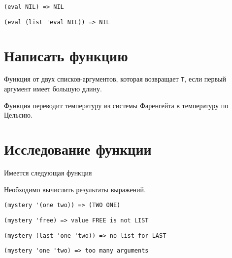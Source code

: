 \problem \hfill
\begin{lstlisting}
(eval NIL) => NIL
\end{lstlisting}


\problem \hfill
\begin{lstlisting}
(eval (list 'eval NIL)) => NIL
\end{lstlisting}



\section{Написать функцию}

\problem Функция от двух списков-аргументов, которая возвращает \verb|T|, если первый аргумент имеет большую длину.



\problem Функция переводит температуру из системы Фаренгейта в температуру по Цельсию.




\section{Исследование функции}

Имеется следующая функция


\noindent
Необходимо вычислить результаты выражений.


\problem \hfill
\begin{lstlisting}
(mystery '(one two)) => (TWO ONE)
\end{lstlisting}


\problem \hfill
\begin{lstlisting}
(mystery 'free) => value FREE is not LIST
\end{lstlisting}


\problem \hfill
\begin{lstlisting}
(mystery (last 'one 'two)) => no list for LAST
\end{lstlisting}


\problem \hfill
\begin{lstlisting}
(mystery 'one 'two) => too many arguments
\end{lstlisting}